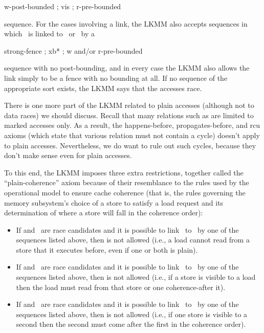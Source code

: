 \begin{VerbatimU}
	w-post-bounded ; vis ; r-pre-bounded
\end{VerbatimU}

\noindent%
sequence.
For the cases involving a  link, the LKMM also accepts
sequences in which ~is linked to~ or~ by a

\begin{VerbatimU}
	strong-fence ; xb* ; {w and/or r}-pre-bounded
\end{VerbatimU}

\noindent%
sequence with no post-bounding, and in every case the LKMM also allows
the link simply to be a fence with no bounding at all.
If no sequence
of the appropriate sort exists, the LKMM says that the accesses race.

There is one more part of the LKMM related to plain accesses (although
not to data races) we should discuss.
Recall that many relations such
as  are limited to marked accesses only.
As a result, the
happens-before, propagates-before, and rcu axioms (which state that
various relation must not contain a cycle) doesn't apply to plain
accesses.
Nevertheless, we do want to rule out such cycles, because
they don't make sense even for plain accesses.

To this end, the LKMM imposes three extra restrictions, together
called the ``plain-coherence'' axiom because of their resemblance to the
rules used by the operational model to ensure cache coherence (that
is, the rules governing the memory subsystem's choice of a store to
satisfy a load request and its determination of where a store will
fall in the coherence order):

\begin{itemize}
\item	If  and~ are race candidates and it is possible to
	link~ to~%
	 by one of the  sequences listed above, then
	 is
	not allowed (i.e., a load cannot read from a store that it
	executes before, even if one or both is plain).

\item	If  and~ are race candidates and it is possible to
	link~ to~%
	 by one of the  sequences listed above, then
	 is
	not allowed (i.e., if a store is visible to a load then the
	load must read from that store or one coherence-after it).

\item	If  and~ are race candidates and it is possible to
	link~
	to~ by one of the  sequences listed above, then
	is not allowed (i.e., if one store is visible to a second then
	the second must come after the first in the coherence order).
\end{itemize}

